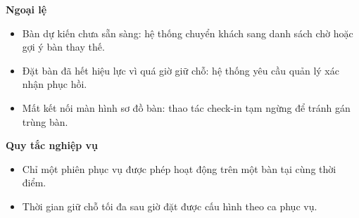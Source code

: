 \documentclass[11pt,a4paper]{article}
\begin{document}
\begin{usecasebox}[title={UC-RES-02 --- Nhận khách và sắp bàn}]
    \textbf{Ngoại lệ}
    \begin{itemize}[leftmargin=1.8em]
  \item Bàn dự kiến chưa sẵn sàng: hệ thống chuyển khách sang danh sách chờ hoặc gợi ý bàn thay thế.
  \item Đặt bàn đã hết hiệu lực vì quá giờ giữ chỗ: hệ thống yêu cầu quản lý xác nhận phục hồi.
  \item Mất kết nối màn hình sơ đồ bàn: thao tác check-in tạm ngừng để tránh gán trùng bàn.
\end{itemize}

    \textbf{Quy tắc nghiệp vụ}
    \begin{itemize}[leftmargin=1.8em]
  \item Chỉ một phiên phục vụ được phép hoạt động trên một bàn tại cùng thời điểm.
  \item Thời gian giữ chỗ tối đa sau giờ đặt được cấu hình theo ca phục vụ.
\end{itemize}
    \end{usecasebox}
\end{document}
